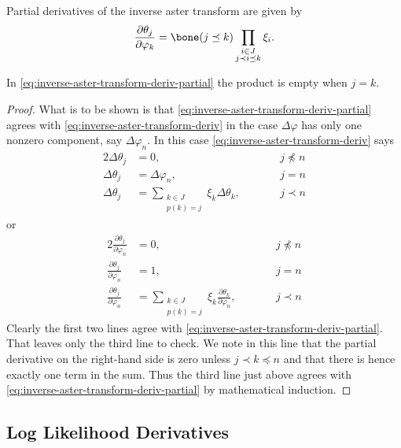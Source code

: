 \begin{theorem} \label{th:inverse-aster-transform-deriv-partial}
Partial derivatives of the inverse aster transform are given by
\begin{equation} \label{eq:inverse-aster-transform-deriv-partial}
   \frac{\partial \theta_j}{\partial \varphi_k}
   =
   \bone(j \preceq k)
   \prod_{\substack{i \in J \\ j \prec i \preceq k}} \xi_i.
\end{equation}
\end{theorem}
In \eqref{eq:inverse-aster-transform-deriv-partial} the product is empty
when $j = k$.
\begin{proof}
What is to be shown is that \eqref{eq:inverse-aster-transform-deriv-partial}
agrees with \eqref{eq:inverse-aster-transform-deriv} in the case
$\Delta \varphi$ has only one nonzero component, say $\Delta \varphi_n$.
In this case \eqref{eq:inverse-aster-transform-deriv} says
\begin{alignat*}{2}
   \Delta \theta_j & = 0, & \qquad & j \not\preceq n
   \\
   \Delta \theta_j
   & =
   \Delta \varphi_n, & & j = n
   \\
   \Delta \theta_j
   & =
   \sum_{\substack{k \in J \\ p(k) = j}} \xi_k \Delta \theta_k,
   & & j \prec n
\end{alignat*}
or
\begin{alignat*}{2}
   \frac{\partial \theta_j}{\partial \varphi_n} & = 0,
   & \qquad & j \not\preceq n
   \\
   \frac{\partial \theta_j}{\partial \varphi_n} & = 1, & & j = n
   \\
   \frac{\partial \theta_j}{\partial \varphi_n}
   & =
   \sum_{\substack{k \in J \\ p(k) = j}} \xi_k 
   \frac{\partial \theta_k}{\partial \varphi_n},
   & & j \prec n
\end{alignat*}
Clearly the first two lines agree with
\eqref{eq:inverse-aster-transform-deriv-partial}.
That leaves only the third line to check.
We note in this line that the partial derivative on the right-hand side
is zero unless $j \prec k \preceq n$ and that there is hence exactly one
term in the sum.
Thus the third line just above agrees with
\eqref{eq:inverse-aster-transform-deriv-partial} by mathematical induction.
\end{proof}

\subsection{Log Likelihood Derivatives}
\label{sec:log-likelihood-derivatives}

